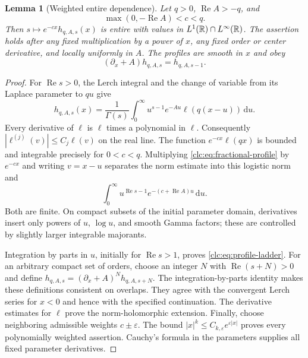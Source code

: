 \documentclass[11pt,a4paper]{article}
\numberwithin{equation}{section}
\newtheorem{lemma}[theorem]{Lemma}
\theoremstyle{definition}\newtheorem{definition}[theorem]{Definition}
\theoremstyle{remark}\newtheorem{remark}[theorem]{Remark}
\DeclareMathOperator{\Rea}{Re}
\newcommand{\dd}{\,\mathrm d}
\begin{document}
\begin{lemma}[Weighted entire dependence]\label{clc:lem:weighted}
Let $q>0$, $\Rea A>-q$, and
\begin{equation}\label{clc:eq:strip}
 \max(0,-\Rea A)<c<q.
\end{equation}
Then $s\mapsto e^{-cx}h_{q,A,s}(x)$ is entire with values in
$L^1(\mathbb R)\cap L^\infty(\mathbb R)$. The assertion holds after any fixed
multiplication by a power of $x$, any fixed order or center derivative,
and locally uniformly in $A$. The profiles are smooth in $x$ and obey
\begin{equation}\label{clc:eq:profile-ladder}
 (\partial_x+A)h_{q,A,s}=h_{q,A,s-1}.
\end{equation}
\end{lemma}
\begin{proof}
For $\Rea s>0$, the Lerch integral and the change of variable from its
Laplace parameter to $qu$ give
\begin{equation}\label{clc:eq:fractional-profile}
 h_{q,A,s}(x)=\frac1{\Gamma(s)}
 \int_0^\infty u^{s-1}e^{-Au}\ell(q(x-u))\dd u.
\end{equation}
Every derivative of $\ell$ is $\ell$ times a polynomial in $\ell$.
Consequently $|\ell^{(j)}(v)|\le C_j\ell(v)$ on the real line.
The function $e^{-cx}\ell(qx)$ is bounded and integrable precisely for
$0<c<q$. Multiplying \eqref{clc:eq:fractional-profile} by $e^{-cx}$ and
writing $v=x-u$ separates the norm estimate into this logistic norm and
\[
 \int_0^\infty u^{\Rea s-1}e^{-(c+\Rea A)u}\dd u.
\]
Both are finite. On compact subsets of the initial parameter domain,
derivatives insert only powers of $u$, $\log u$, and smooth Gamma factors;
these are controlled by slightly larger integrable majorants.

Integration by parts in $u$, initially for $\Rea s>1$, proves
\eqref{clc:eq:profile-ladder}. For an arbitrary compact set of orders,
choose an integer $N$ with $\Rea(s+N)>0$ and define
$h_{q,A,s}=(\partial_x+A)^Nh_{q,A,s+N}$. The integration-by-parts identity
makes these definitions consistent on overlaps. They agree with the
convergent Lerch series for $x<0$ and hence with the specified continuation.
The derivative estimates for $\ell$ prove the norm-holomorphic extension.
Finally, choose neighboring admissible weights $c\pm\varepsilon$.
The bound $|x|^k\le C_{k,\varepsilon}e^{\varepsilon|x|}$ proves every
polynomially weighted assertion. Cauchy's formula in the parameters
supplies all fixed parameter derivatives.
\end{proof}
\end{document}
